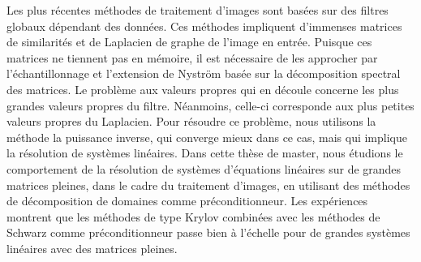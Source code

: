 Les plus récentes méthodes de traitement d'images sont basées sur des filtres globaux dépendant des données.
Ces méthodes impliquent d'immenses matrices de similarités et de Laplacien de graphe de l'image en entrée.
Puisque ces matrices ne tiennent pas en mémoire, il est nécessaire de les approcher par l'échantillonnage et l'extension de Nystr\"om basée sur la décomposition spectral des matrices.
Le problème aux valeurs propres qui en découle concerne les plus grandes valeurs propres du filtre.
Néanmoins, celle-ci corresponde aux plus petites valeurs propres du Laplacien.
Pour résoudre ce problème, nous utilisons la méthode la puissance inverse, qui converge mieux dans ce cas, mais qui implique la résolution de systèmes linéaires.
Dans cette thèse de master, nous étudions le comportement de la résolution de systèmes d'équations linéaires sur de grandes matrices pleines, dans le cadre du traitement d'images, en utilisant des méthodes de décomposition de domaines comme préconditionneur.
Les expériences montrent que les méthodes de type Krylov combinées avec les méthodes de Schwarz comme préconditionneur passe bien à l'échelle pour de grandes systèmes linéaires avec des matrices pleines.
